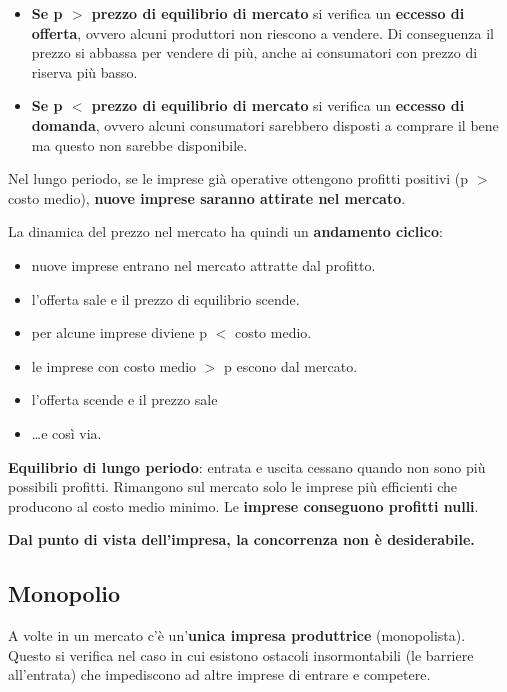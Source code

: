 \documentclass[../main.tex]{subfiles}
\begin{document}
\begin{itemize}
    \item \textbf{Se p $>$ prezzo di equilibrio di mercato} si verifica un \textbf{eccesso di offerta}, ovvero alcuni produttori non riescono a vendere. Di conseguenza il prezzo si abbassa per vendere di più, anche ai consumatori con prezzo di riserva più basso.
    \item \textbf{Se p $<$ prezzo di equilibrio di mercato} si verifica un \textbf{eccesso di domanda}, ovvero alcuni consumatori sarebbero disposti a comprare il bene ma questo non sarebbe disponibile.
\end{itemize}

Nel lungo periodo, se le imprese già operative ottengono profitti positivi (p $>$ costo medio), \textbf{nuove imprese saranno attirate nel mercato}.

La dinamica del prezzo nel mercato ha quindi un \textbf{andamento ciclico}:

\begin{itemize}
    \item nuove imprese entrano nel mercato attratte dal profitto.
    \item l'offerta sale e il prezzo di equilibrio scende.
    \item per alcune imprese diviene p $<$ costo medio.
    \item le imprese con costo medio $>$ p escono dal mercato.
    \item l'offerta scende e il prezzo sale
    \item \dots e così via.
\end{itemize}

\textbf{Equilibrio di lungo periodo}: entrata e uscita cessano quando non sono più possibili profitti. Rimangono sul mercato solo le imprese più efficienti che producono al costo medio minimo. Le \textbf{imprese conseguono profitti nulli}.

\textbf{Dal punto di vista dell'impresa, la concorrenza non è desiderabile.}

\subsection{Monopolio}

A volte in un mercato c'è un'\textbf{unica impresa produttrice} (monopolista). 
Questo si verifica nel caso in cui esistono ostacoli insormontabili (le barriere all'entrata) che impediscono ad altre imprese di entrare e competere.
\end{document}
